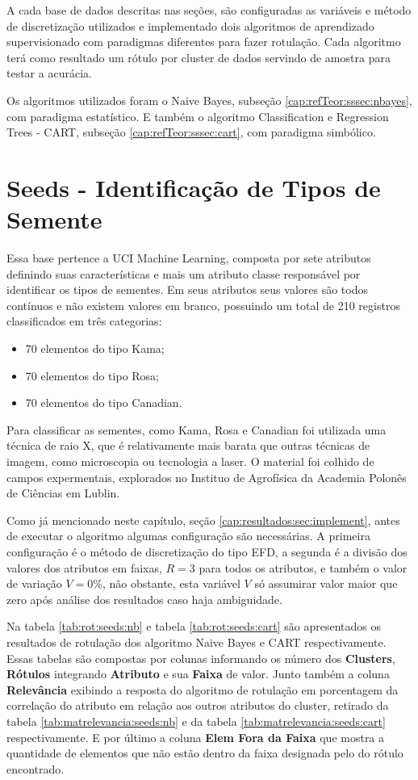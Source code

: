 A cada base de dados descritas nas seções, são configuradas as variáveis e método de discretização utilizados e implementado dois algoritmos de aprendizado supervisionado com paradigmas diferentes para fazer rotulação. Cada algoritmo terá como resultado um rótulo por cluster de dados servindo de amostra para testar a acurácia.

Os algoritmos utilizados foram o Naive Bayes, subseção \ref{cap:refTeor:sssec:nbayes}, com paradigma estatístico. E também o algoritmo Classification e Regression Trees - CART, subseção \ref{cap:refTeor:sssec:cart}, com paradigma simbólico.

\section{Seeds - Identificação de Tipos de Semente}
Essa base pertence a UCI Machine Learning, composta por sete  atributos definindo suas características e mais um atributo classe  responsável por identificar os tipos de sementes. Em seus atributos  seus valores são todos contínuos e não existem valores em branco,  possuindo um total de 210 registros classificados em três categorias:
\begin{itemize}[noitemsep]
 \item 70 elementos do tipo Kama;
 \item 70 elementos do tipo Rosa;
 \item 70 elementos do tipo Canadian.
\end{itemize}
Para classificar as sementes, como Kama, Rosa e Canadian foi utilizada uma técnica de raio X, que é relativamente mais barata que outras técnicas de imagem, como microscopia ou tecnologia a laser. O material foi colhido de campos expermentais, explorados no Instituo de Agrofísica da Academia Polonês de Ciências em Lublin.

Como já mencionado neste capítulo, seção \ref{cap:resultados:sec:implement}, antes de executar o algoritmo algumas configuração são necessárias. A primeira configuração é o método de discretização do tipo EFD, a segunda é a divisão dos valores dos atributos em faixas, ${R=3}$ para todos os atributos, e também o valor de variação ${V=0\%}$,  não obstante, esta variável ${V}$ só assumirar valor maior que zero após análise dos resultados caso haja ambiguidade.

Na tabela \ref{tab:rot:seeds:nb} e tabela \ref{tab:rot:seeds:cart} são  apresentados os resultados de rotulação dos algoritmo Naive Bayes e CART respectivamente. Essas tabelas são compostas por colunas informando os número dos \textbf{Clusters}, \textbf{Rótulos}  integrando \textbf{Atributo} e sua \textbf{Faixa} de valor. Junto também a coluna \textbf{Relevância} exibindo a resposta do algoritmo de rotulação em porcentagem da correlação do atributo em relação aos outros atributos do cluster, retirado da tabela \ref{tab:matrelevancia:seeds:nb} e da tabela \ref{tab:matrelevancia:seeds:cart} respectivamente. E por último a coluna \textbf{Elem Fora da Faixa} que mostra a quantidade de elementos que não estão dentro da faixa designada pelo do rótulo encontrado.

